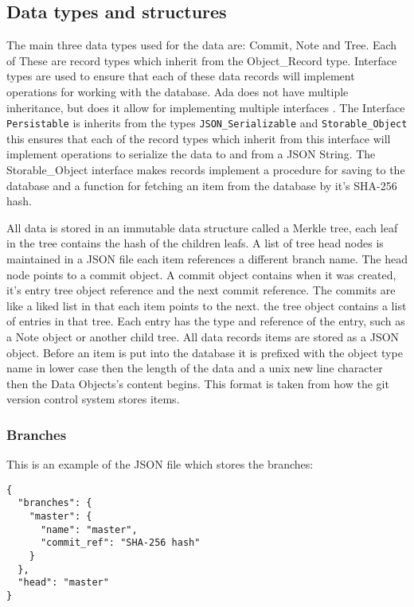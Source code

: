 \documentclass[12pt,a4paper]{article}
\newcommand{\codetext}[1]{\colorbox{light-gray}{\texttt{#1}}}
\begin{document}
\subsection{Data types and structures}
The main three data types used for the data are: Commit, Note and Tree. Each of These are record types which inherit from the Object\_Record type. Interface types are used to ensure that each of these data records will implement operations for working with the database. Ada does not have multiple inheritance, but does it allow for implementing multiple interfaces  \cite{Ada-Interface-Types}. The Interface \codetext{Persistable} is inherits from the types \codetext{JSON\_Serializable} and \codetext{Storable\_Object} this ensures that each of the record types which inherit from this interface will implement operations to serialize the data to and from a JSON \cite{rfc7159} String. The Storable\_Object interface makes records implement a procedure for saving to the database and a function for fetching an item from the database by it's SHA-256 hash.  \\

\par
All data is stored in an immutable data structure called a Merkle tree, each leaf in the tree contains the hash of the children leafs. A list of tree head nodes is maintained in a JSON file each item references a different branch name. The head node points to a commit object. A commit object contains when it was created, it's entry tree object reference and the next commit reference. The commits are like a liked list in that each item points to the next. the tree object contains a list of entries in that tree. Each entry has the type and reference of the entry, such as a Note object or another child tree. All data records items are stored as a JSON object. Before an item is put into the database it is prefixed with the object type name in lower case then the length of the data and a unix new line character then the Data Objects's content begins. This format is taken from how the git version control system stores items.

\subsubsection{Branches}

This is an example of the JSON file which stores the branches:

\begin{verbatim}
{
  "branches": {
    "master": {
      "name": "master",
      "commit_ref": "SHA-256 hash"
    }
  },
  "head": "master"
}
\end{verbatim}
\end{document}
